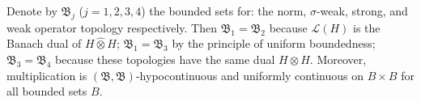 Denote by $\mathfrak{B}_j$ ($j = 1, 2, 3, 4$) the bounded sets for: the norm, $\sigma$-weak, strong, and weak operator topology respectively. Then $\mathfrak{B}_1 = \mathfrak{B}_2$ because $\mathcal{L}(H)$ is the Banach dual of $H \hat{\otimes} H$; $\mathfrak{B}_1 = \mathfrak{B}_3$ by the principle of uniform boundedness; $\mathfrak{B}_3 = \mathfrak{B}_4$ because these topologies have the same dual $H \otimes H$. Moreover, multiplication is $(\mathfrak{B}, \mathfrak{B})$-hypocontinuous and uniformly continuous on $B \times B$ for all bounded sets $B$.
